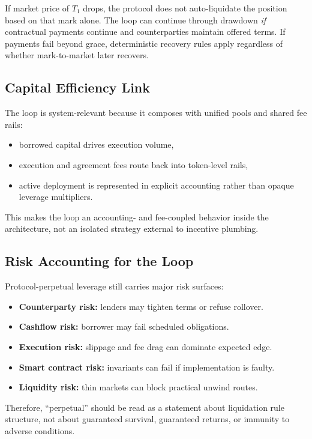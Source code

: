 \documentclass[version=preprint]{iacrcc}
\begin{document}
If market price of $T_1$ drops, the protocol does not auto-liquidate the position based on that mark alone. The loop can continue through drawdown \emph{if} contractual payments continue and counterparties maintain offered terms. If payments fail beyond grace, deterministic recovery rules apply regardless of whether mark-to-market later recovers.

\subsection{Capital Efficiency Link}

The loop is system-relevant because it composes with unified pools and shared fee rails:
\begin{itemize}
  \item borrowed capital drives execution volume,
  \item execution and agreement fees route back into token-level rails,
  \item active deployment is represented in explicit accounting rather than opaque leverage multipliers.
\end{itemize}

This makes the loop an accounting- and fee-coupled behavior inside the architecture, not an isolated strategy external to incentive plumbing.

\subsection{Risk Accounting for the Loop}

Protocol-perpetual leverage still carries major risk surfaces:
\begin{itemize}
  \item \textbf{Counterparty risk:} lenders may tighten terms or refuse rollover.
  \item \textbf{Cashflow risk:} borrower may fail scheduled obligations.
  \item \textbf{Execution risk:} slippage and fee drag can dominate expected edge.
  \item \textbf{Smart contract risk:} invariants can fail if implementation is faulty.
  \item \textbf{Liquidity risk:} thin markets can block practical unwind routes.
\end{itemize}

Therefore, ``perpetual'' should be read as a statement about liquidation rule structure, not about guaranteed survival, guaranteed returns, or immunity to adverse conditions.
\end{document}
